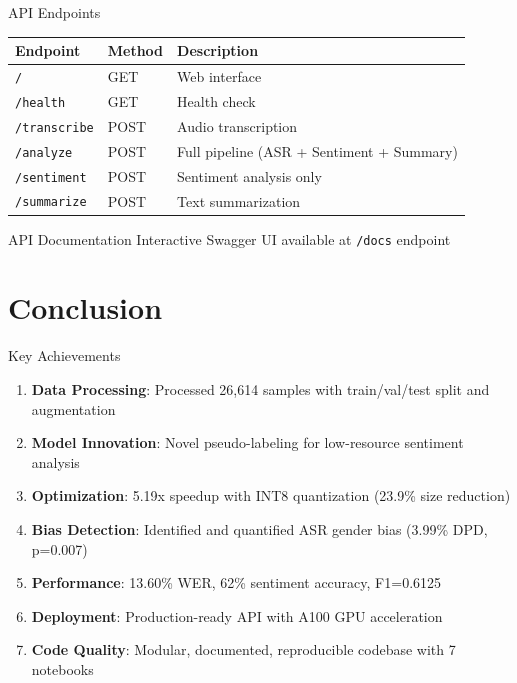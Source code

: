 \documentclass[aspectratio=169,10pt]{beamer}
\begin{document}
\begin{frame}{API Endpoints}
\begin{table}
\centering
\small
\begin{tabular}{@{}llp{5cm}@{}}
\toprule
\textbf{Endpoint} & \textbf{Method} & \textbf{Description} \\
\midrule
\texttt{/} & GET & Web interface \\
\texttt{/health} & GET & Health check \\
\texttt{/transcribe} & POST & Audio transcription \\
\texttt{/analyze} & POST & Full pipeline (ASR + Sentiment + Summary) \\
\texttt{/sentiment} & POST & Sentiment analysis only \\
\texttt{/summarize} & POST & Text summarization \\
\bottomrule
\end{tabular}
\end{table}

\vspace{0.3cm}
\begin{block}{API Documentation}
Interactive Swagger UI available at \texttt{/docs} endpoint
\end{block}
\end{frame}

\section{Conclusion}

\begin{frame}{Key Achievements}
\begin{enumerate}
    \item \textbf{Data Processing}: Processed 26,614 samples with train/val/test split and augmentation
    \item \textbf{Model Innovation}: Novel pseudo-labeling for low-resource sentiment analysis
    \item \textbf{Optimization}: 5.19x speedup with INT8 quantization (23.9\% size reduction)
    \item \textbf{Bias Detection}: Identified and quantified ASR gender bias (3.99\% DPD, p=0.007)
    \item \textbf{Performance}: 13.60\% WER, 62\% sentiment accuracy, F1=0.6125
    \item \textbf{Deployment}: Production-ready API with A100 GPU acceleration
    \item \textbf{Code Quality}: Modular, documented, reproducible codebase with 7 notebooks
\end{enumerate}
\end{frame}
\end{document}
